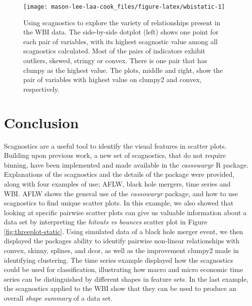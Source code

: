 \begin{figure}
\texttt{[image: mason-lee-laa-cook\_files/figure-latex/wbistatic-1]} \caption{Using scagnostics to explore the variety of relationships present in the WBI data. The side-by-side dotplot (left) shows one point for each pair of variables, with its highest scagnostic value among all scagnostics calculated. Most of the pairs of indicators exhibit outliers, skewed, stringy or convex. There is one pair that has clumpy as the highest value. The plots, middle and right, show the pair of variables with highest value on clumpy2 and convex, respectively.}\label{fig:wbistatic}
\end{figure}

\hypertarget{conclusion}{%
\section{Conclusion}\label{conclusion}}

Scagnostics are a useful tool to identify the visual features in scatter plots. Building upon previous work, a new set of scagnostics, that do not require binning, have been implemented and made available in the \emph{cassowaryr} R package. Explanations of the scagnostics and the details of the package were provided, along with four examples of use; AFLW, black hole mergers, time series and WBI. AFLW shows the general use of the \emph{cassowaryr} package, and how to use scagnostics to find unique scatter plots. In this example, we also showed that looking at specific pairwise scatter plots can give us valuable information about a data set by interpreting the \emph{hitouts vs bounces} scatter plot in Figure \ref{fig:threeplot-static}. Using simulated data of a black hole merger event, we then displayed the packages ability to identify pairwise non-linear relationships with convex, skinny, splines, and dcor, as well as the improvement clumpy2 made in identifying clustering. The time series example displayed how the scagnostics could be used for classification, illustrating how macro and micro economic time series can be distinguished by different shapes in feature sets. In the last example, the scagnostics applied to the WBI show that they can be used to produce an overall \emph{shape summary} of a data set.


